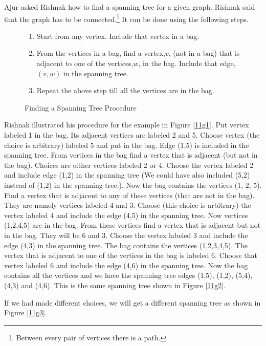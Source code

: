 Ajur asked Rishnak how to find a spanning tree for a given graph. Rishnak said that the graph has to be connected.\footnote{Between every pair of vertices there is a path.} It can be done using the following steps.
\begin{figure} 
\begin{enumerate}
\item Start from any vertex. Include that vertex in a bag.
\item From the vertices in a bag, find a vertex,$v$, (not in a bag) that is adjacent to one of the vertices,$w$, in the bag. Include that edge, $(v,w)$ in the spanning tree.
\item Repeat the above step till all the vertices are in the bag.
\end{enumerate}
\caption{Finding a Spanning Tree Procedure}\label{11a1}
\end{figure}
Rishnak illustrated his procedure for the example in Figure \ref{11g1}.
Put vertex labeled 1 in the bag. Its adjacent vertices are labeled 2 and 5. Choose vertex (the choice is arbitrary) labeled 5 and put in the bag. Edge (1,5) is included in the spanning tree. From vertices in the bag find a vertex that is adjacent (but not in the bag). Choices are either vertices labeled 2 or 4. Choose the vertex labeled 2 and include edge (1,2) in the spanning tree (We could have also included (5,2) instead of (1,2) in the spanning tree.). Now the bag contains the vertices (1, 2, 5). Find a vertex that is adjacent to any of these vertices (that are not in the bag). They are namely vertices labeled 4 and 3. Choose (this choice is arbitrary) the vertex labeled 4 and include the edge (4,5) in the spanning tree. Now vertices (1,2,4,5) are in the bag. From these vertices find a vertex that is adjacent but not in the bag. They will be 6 and 3.  Choose the vertex labeled 3 and include the edge (4,3) in the spanning tree. The bag contains the vertices (1,2,3,4,5). The vertex that is adjacent to one
of the vertices in the bag is labeled 6. Choose that vertex labeled 6 and include the edge (4,6) in the spanning tree. Now the bag contains all the vertices and we have the spanning tree edges (1,5), (1,2), (5,4), (4,3) and (4,6). This is the same spanning tree shown in Figure \ref{11g2}.

If we had made different choices, we will get a different spanning tree as shown in Figure \ref{11g3}.

